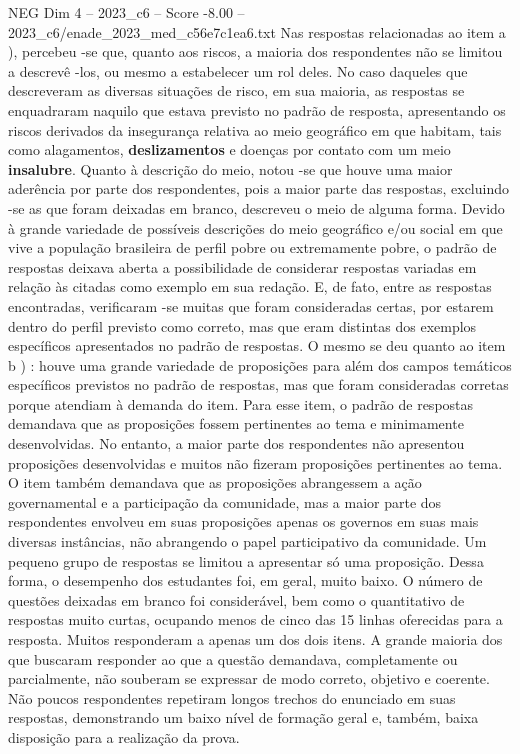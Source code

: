 \begin{textsample}{NEG Dim 4 – 2023\_c6 – Score -8.00 – 2023\_c6/enade\_2023\_med\_c56e7c1ea6.txt}
Nas respostas relacionadas ao item a ), percebeu -se que, quanto aos riscos, a maioria dos respondentes não se limitou a descrevê -los, ou mesmo a estabelecer um rol deles.
No caso daqueles que descreveram as diversas situações de risco, em sua maioria, as respostas se enquadraram naquilo que estava previsto no padrão de resposta, apresentando os riscos derivados da insegurança relativa ao meio geográfico em que habitam, tais como alagamentos, \textbf{deslizamentos} e doenças por contato com um meio \textbf{insalubre}.
Quanto à descrição do meio, notou -se que houve uma maior aderência por parte dos respondentes, pois a maior parte das respostas, excluindo -se as que foram deixadas em branco, descreveu o meio de alguma forma.
Devido à grande variedade de possíveis descrições do meio geográfico e/ou social em que vive a população brasileira de perfil pobre ou extremamente pobre, o padrão de respostas deixava aberta a possibilidade de considerar respostas variadas em relação às citadas como exemplo em sua redação.
E, de fato, entre as respostas encontradas, verificaram -se muitas que foram consideradas certas, por estarem dentro do perfil previsto como correto, mas que eram distintas dos exemplos específicos apresentados no padrão de respostas.
O mesmo se deu quanto ao item b ) : houve uma grande variedade de proposições para além dos campos temáticos específicos previstos no padrão de respostas, mas que foram consideradas corretas porque atendiam à demanda do item.
Para esse item, o padrão de respostas demandava que as proposições fossem pertinentes ao tema e minimamente desenvolvidas.
No entanto, a maior parte dos respondentes não apresentou proposições desenvolvidas e muitos não fizeram proposições pertinentes ao tema.
O item também demandava que as proposições abrangessem a ação governamental e a participação da comunidade, mas a maior parte dos respondentes envolveu em suas proposições apenas os governos em suas mais diversas instâncias, não abrangendo o papel participativo da comunidade.
Um pequeno grupo de respostas se limitou a apresentar só uma proposição.
Dessa forma, o desempenho dos estudantes foi, em geral, muito baixo.
O número de questões deixadas em branco foi considerável, bem como o quantitativo de respostas muito curtas, ocupando menos de cinco das 15 linhas oferecidas para a resposta.
Muitos responderam a apenas um dos dois itens.
A grande maioria dos que buscaram responder ao que a questão demandava, completamente ou parcialmente, não souberam se expressar de modo correto, objetivo e coerente.
Não poucos respondentes repetiram longos trechos do enunciado em suas respostas, demonstrando um baixo nível de formação geral e, também, baixa disposição para a realização da prova.

\end{textsample}
